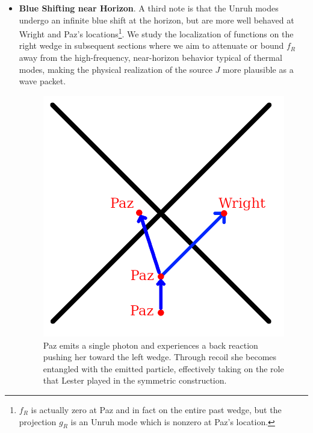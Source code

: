 \documentclass[12pt,a4paper]{article}
\begin{document}
{\begin{itemize}
\item {\bf Blue Shifting near Horizon}. A third note is that the Unruh modes undergo an infinite blue shift at the horizon, but are more well behaved at Wright and Paz's locations\footnote{$f_R$ is actually zero at Paz and in fact on the entire past wedge, but the projection $g_R$ is an Unruh mode which is nonzero at Paz's location.}. We study the localization of functions on the right wedge in subsequent sections where we aim to attenuate or bound $f_R$ away from the high-frequency, near-horizon behavior typical of thermal modes, making the physical realization of the source $J$ more plausible as a wave packet.

\begin{figure}[h]
\centering
\includegraphics[scale=0.75]{back_reaction.png}
\captionsetup{width=0.7\textwidth}
\caption{Paz emits a single photon and experiences a back reaction pushing her toward the left wedge. Through recoil she becomes entangled with the emitted particle, effectively taking on the role that Lester played in the symmetric construction.}
\label{back_react}
\end{figure}


\end{itemize}}
\end{document}
